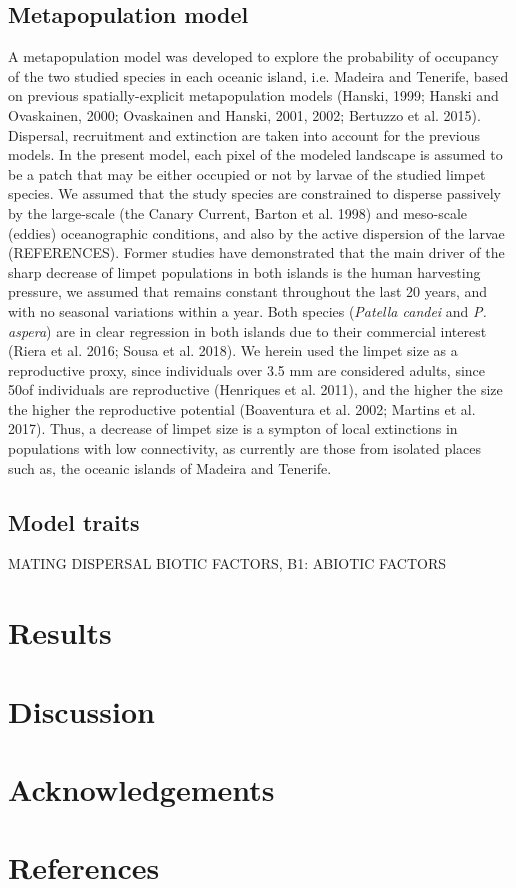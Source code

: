 \documentclass[12pt]{article}
\begin{document}
\subsection{Metapopulation model}
A metapopulation model was developed to explore the probability of
occupancy of the two studied species in each oceanic island,
i.e. Madeira and Tenerife, based on previous spatially-explicit
metapopulation models (Hanski, 1999; Hanski and Ovaskainen, 2000;
Ovaskainen and Hanski, 2001, 2002; Bertuzzo et al. 2015). Dispersal,
recruitment and extinction are taken into account for the previous
models. In the present model, each pixel of the modeled landscape is
assumed to be a patch that may be either occupied or not by larvae of
the studied limpet species. We assumed that the study species are
constrained to disperse passively by the large-scale (the Canary
Current, Barton et al. 1998) and meso-scale (eddies) oceanographic
conditions, and also by the active dispersion of the larvae
(REFERENCES). Former studies have demonstrated that the main driver of
the sharp decrease of limpet populations in both islands is the human
harvesting pressure, we assumed that remains constant throughout the
last 20 years, and with no seasonal variations within a year. Both
species (\textit{Patella candei} and \textit{P. aspera}) are in clear
regression in both islands due to their commercial interest (Riera et
al. 2016; Sousa et al. 2018). We herein used the limpet size as a
reproductive proxy, since individuals over 3.5 mm are considered
adults, since 50\percent of individuals are reproductive (Henriques et
al. 2011), and the higher the size the higher the reproductive
potential (Boaventura et al. 2002; Martins et al. 2017). Thus, a
decrease of limpet size is a sympton of local extinctions in
populations with low connectivity, as currently are those from
isolated places such as, the oceanic islands of Madeira and Tenerife.

\subsection {Model traits}
MATING
DISPERSAL
BIOTIC FACTORS, B1: 
ABIOTIC FACTORS




\section{Results}



\section{Discussion}



\section{Acknowledgements}




\section{References}


\end{document}
